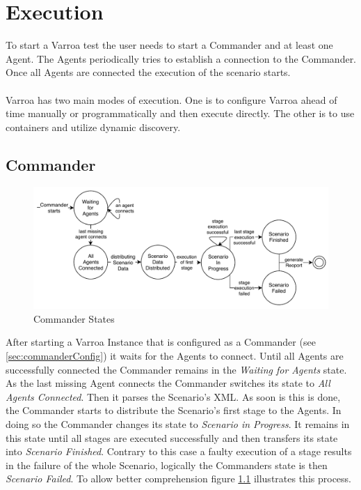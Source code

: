 \chapter{Execution}\label{sec:Execution}
To start a Varroa test the user needs to start a Commander and at least one Agent.
The Agents periodically tries to establish a connection to the Commander.
Once all Agents are connected the execution of the scenario starts.\\
\\
Varroa has two main modes of execution. One is to configure Varroa ahead of time manually or programmatically and then execute directly. The other is to use containers and utilize dynamic discovery.
\section{Commander}
\begin{figure}[H]
	\begin{center}
	\includegraphics[scale=0.9]{Resources/PDF/CommanderStates}
	\caption{Commander States}
	\label{pic:CommanderStates}
	\end{center}
\end{figure}
After starting a Varroa Instance that is configured as a Commander (see \ref{sec:commanderConfig}) it waits for the Agents to connect.
Until all Agents are successfully connected the Commander remains in the \emph{Waiting for Agents} state.
As the last missing Agent connects the Commander switches its state to \emph{All Agents Connected}.
Then it parses the Scenario's XML. As soon is this is done, the Commander starts to distribute the Scenario's first stage to the Agents.
In doing so the Commander changes its state to \emph{Scenario in Progress}.
It remains in this state until all stages are executed successfully and then transfers its state into \emph{Scenario Finished}.
Contrary to this case a faulty execution of a stage results in the failure of the whole Scenario, logically the Commanders state is then \emph{Scenario Failed}.
To allow better comprehension figure \ref{pic:CommanderStates} illustrates this process.

